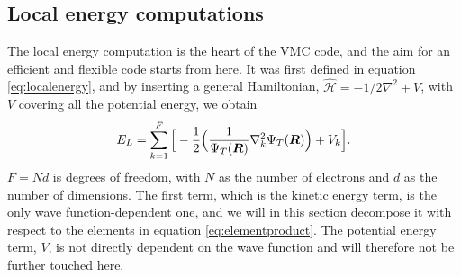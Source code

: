 \subsection{Local energy computations} \label{sec:kinetic}
The local energy computation is the heart of the VMC code, and the aim for an efficient and flexible code starts from here. It was first defined in equation \eqref{eq:localenergy}, and by inserting a general Hamiltonian, $\hat{\mathcal{H}}=-1/2\nabla^2+V$, with $V$ covering all the potential energy, we obtain
\begin{equation}
E_L=\sum_{k=1}^F\Big[-\frac{1}{2}\Big(\frac{1}{\Psi_T(\boldsymbol{{R}})}\nabla_k^2\Psi_T(\boldsymbol{{R}})\Big) + V_k\Big].
\end{equation}
$F=Nd$ is degrees of freedom, with $N$ as the number of electrons and $d$ as the number of dimensions. The first term, which is the kinetic energy term, is the only wave function-dependent one, and we will in this section decompose it with respect to the elements in equation \eqref{eq:elementproduct}. The potential energy term, $V$, is not directly dependent on the wave function and will therefore not be further touched here. 

